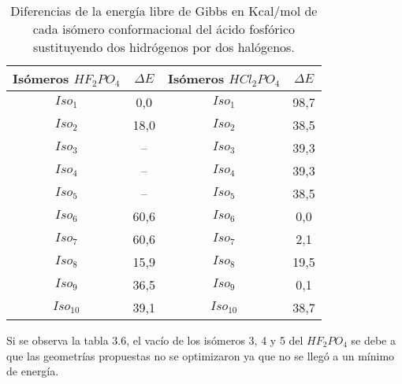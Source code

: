 \begin{table}[H]
	\centering
	\begin{tabular}{|c|c|c|c|}
		\hline
		Isómeros $HF_2PO_4$ & $\Delta E$   & Isómeros $HCl_2PO_4$ & $\Delta E$     \\ \hline
		$Iso_1$  & 0,0     & $Iso_1$     & 98,7 \\ \hline
		$Iso_2$  & 18,0    & $Iso_2$   & 38,5 \\ \hline
		$Iso_3$   & -- & $Iso_3$    & 39,3 \\ \hline
		$Iso_4$   & --& $Iso_4$    & 39,3 \\ \hline
		$Iso_5$   & -- & $Iso_5$  & 38,5 \\ \hline
		$Iso_6$    & 60,6    & $Iso_6$  & 0,0  \\ \hline
		$Iso_7$   & 60,6    & $Iso_7$   & 2,1  \\ \hline
		$Iso_8$    & 15,9    & $Iso_8$  & 19,5 \\ \hline
		$Iso_9$   & 36,5    & $Iso_9$   & 0,1  \\ \hline
		$Iso_{10}$  & 39,1    & $Iso_{10}$   & 38,7 \\ \hline
	\end{tabular}
\caption{Diferencias de la energía libre de Gibbs en Kcal/mol de cada isómero conformacional del ácido fosfórico sustituyendo dos hidrógenos por dos halógenos.}
\end{table}

Si se observa la tabla 3.6, el vacío de los isómeros 3, 4 y 5 del $HF_2PO_4$ se debe a que las geometrías propuestas no se optimizaron ya que no se llegó a un mínimo de energía.


